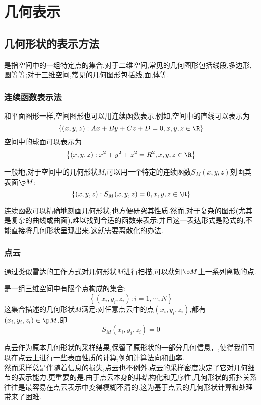 \documentclass{ctexart}
\begin{document}
\section{几何表示}
\subsection{几何形状的表示方法}
是指空间中的一组特定点的集合.对于二维空间,常见的几何图形包括线段,多边形,圆等等;对于三维空间,常见的几何图形包括线,面,体等.
\subsubsection{连续函数表示法}
和平面图形一样,空间图形也可以用连续函数表示.例如,空间中的直线可以表示为
\[\left\{(x,y,z):Ax+By+Cz+D=0,x,y,z\in\R\right\}\]
空间中的球面可以表示为
\[\left\{(x,y,z):x^2+y^2+z^2=R^2,x,y,z\in\R\right\}\]
\begin{definition}[连续函数表示法]
    一般地,对于空间中的几何形状$M$,可以用一个特定的连续函数$S_{M}(x,y,z)$刻画其表面$\p M$:
    \[\left\{(x,y,z):S_M(x,y,z)=0,x,y,z\in\R\right\}\]
\end{definition}
连续函数可以精确地刻画几何形状,也方便研究其性质.然而,对于复杂的图形(尤其是复杂的曲线或曲面),难以找到合适的函数来表示;并且这一表达形式是隐式的,不能直接将几何形状呈现出来.这就需要离散化的办法.
\subsubsection{点云}
通过类似雷达的工作方式对几何形状$M$进行扫描,可以获知$\p M$上一系列离散的点.
\begin{definition}[点云]
    是一组三维空间中有限个点构成的集合:
    \[\left\{\left(x_i,y_i,z_i\right):i=1,\cdots,N\right\}\]
    这集合描述的几何形状$M$满足:对任意点云中的点$\left(x_i,y_i,z_i\right)$,都有$\left(x_i,y_i,z_i\right)\in\p M$,即
    \[S_M\left(x_i,y_i,z_i\right)=0\]
\end{definition}
点云作为原本几何形状的采样结果,保留了原形状的一部分几何信息，,使得我们可以在点云上进行一些表面性质的计算,例如计算法向和曲率.\\
\indent 然而采样总是伴随着信息的损失,点云也不例外.点云的采样密度决定了它对几何细节的表示能力.更重要的是,由于点云本身的非结构化和无序性,几何形状的拓扑关系往往是最容易在点云表示中变得模糊不清的.这为基于点云的几何形状计算和处理带来了困难.
\end{document}
